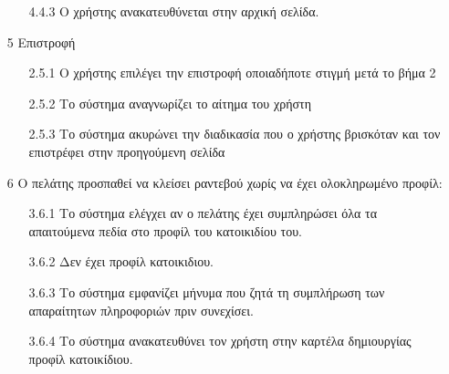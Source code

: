 \documentclass[12pt,a4paper,twoside]{book}
\begin{document}
\begin{enumerate}
\begin{enumerate}
          \item[4.4.3 ] Ο χρήστης  ανακατευθύνεται στην αρχική σελίδα. %
        \end{enumerate}
  \item[5 ] Επιστροφή
        \begin{enumerate}
          \item[2.5.1 ] Ο χρήστης επιλέγει την επιστροφή οποιαδήποτε στιγμή μετά το βήμα 2 %
          \item[2.5.2 ] Το σύστημα αναγνωρίζει το αίτημα του χρήστη %
          \item[2.5.3 ] Το σύστημα ακυρώνει την διαδικασία που ο χρήστης βρισκόταν και τον επιστρέφει στην προηγούμενη σελίδα %
        \end{enumerate}
  \item[6 ] Ο πελάτης προσπαθεί να κλείσει ραντεβού χωρίς να έχει ολοκληρωμένο προφίλ:
        \begin{enumerate}
          \item[3.6.1 ] Το σύστημα ελέγχει αν ο πελάτης έχει συμπληρώσει όλα τα απαιτούμενα πεδία στο προφίλ του κατοικιδίου του. %
          \item[3.6.2 ] Δεν έχει προφίλ κατοικιδιου. %
          \item[3.6.3 ] Το σύστημα εμφανίζει μήνυμα που ζητά τη συμπλήρωση των απαραίτητων πληροφοριών πριν συνεχίσει. %
          \item[3.6.4 ] Το σύστημα ανακατευθύνει τον χρήστη στην καρτέλα δημιουργίας προφίλ κατοικίδιου. %
        \end{enumerate}
\end{enumerate}
\end{document}
